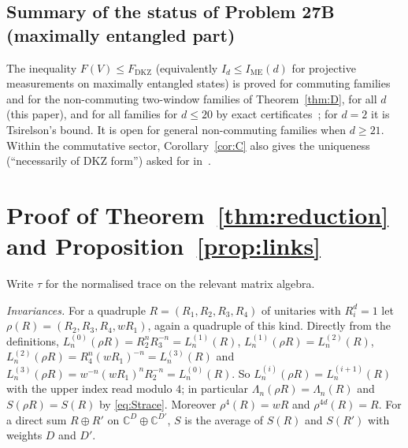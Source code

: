 \documentclass[11pt]{amsart}
\theoremstyle{definition}
\theoremstyle{remark}
\newcommand{\C}{\mathbb{C}}
\newcommand{\FD}{F_{\mathrm{DKZ}}}
\newcommand{\IME}{I_{\mathrm{ME}}}
\begin{document}
\subsection{Summary of the status of Problem 27B (maximally entangled part)}
The inequality $F(V)\le\FD$ (equivalently $I_d\le\IME(d)$ for projective measurements on maximally entangled
states) is proved for commuting families and for the non-commuting two-window families of Theorem~\ref{thm:D}, for
all $d$ (this paper), and for all families for $d\le20$ by exact certificates~\cite{repo}; for $d=2$ it is
Tsirelson's bound. It is open for general non-commuting families when $d\ge21$.
Within the commutative sector, Corollary~\ref{cor:C} also gives the uniqueness (``necessarily of DKZ form'') asked
for in~\cite{OQP}.

\appendix
\section{Proof of Theorem~\ref{thm:reduction} and Proposition~\ref{prop:links}}\label{app:reduction}

Write $\tau$ for the normalised trace on the relevant matrix algebra.

\emph{Invariances.} For a quadruple $R=(R_1,R_2,R_3,R_4)$ of unitaries with $R_i^d=1$ let
$\rho(R)=(R_2,R_3,R_4,wR_1)$, again a quadruple of this kind. Directly from the definitions,
$L^{(0)}_n(\rho R)=R_2^nR_3^{-n}=L^{(1)}_n(R)$, $L^{(1)}_n(\rho R)=L^{(2)}_n(R)$,
$L^{(2)}_n(\rho R)=R_4^n(wR_1)^{-n}=L^{(3)}_n(R)$ and $L^{(3)}_n(\rho R)=w^{-n}(wR_1)^nR_2^{-n}=L^{(0)}_n(R)$. So
$L^{(i)}_n(\rho R)=L^{(i+1)}_n(R)$ with the upper index read modulo $4$; in particular $\Lambda_n(\rho R)=\Lambda_n(R)$ and
$S(\rho R)=S(R)$ by \eqref{eq:Strace}. Moreover $\rho^4(R)=wR$ and $\rho^{4d}(R)=R$. For a direct sum $R\oplus R'$ on
$\C^D\oplus\C^{D'}$, $S$ is the average of $S(R)$ and $S(R')$ with weights $D$ and $D'$.
\end{document}
